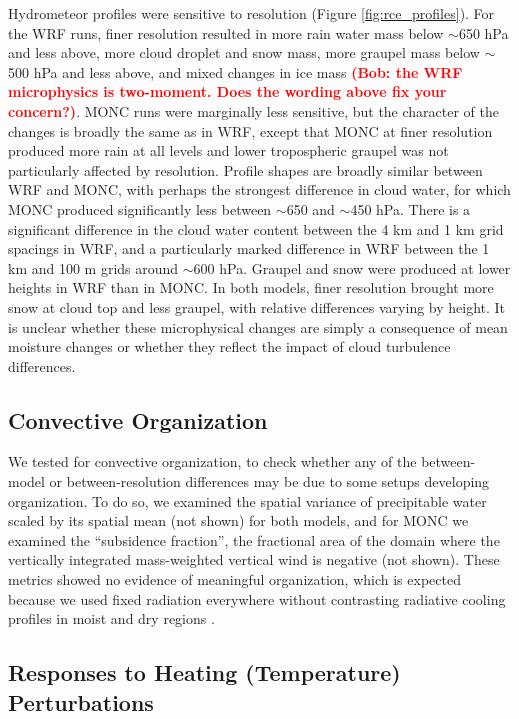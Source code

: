 \documentclass[draft]{agujournal2019}
\newcommand{\todo}[1]{\textcolor{red}{\textbf{(#1)}}}
\begin{document}
Hydrometeor profiles were sensitive to resolution (Figure
\ref{fig:rce_profiles}). For the WRF runs, finer resolution resulted in more
rain water mass below $\sim$650 hPa and less above, more cloud droplet and snow
mass, more graupel mass below $\sim$500 hPa and less above, and mixed changes in
ice mass \todo{Bob: the WRF microphysics is two-moment. Does the wording above
fix your concern?}. MONC runs were marginally less sensitive, but the character
of the changes is broadly the same as in WRF, except that MONC at finer
resolution produced more rain at all levels and lower tropospheric graupel was
not particularly affected by resolution. Profile shapes are broadly similar
between WRF and MONC, with perhaps the strongest difference in cloud water, for
which MONC produced significantly less between $\sim$650 and $\sim$450 hPa.
There is a significant difference in the cloud water content between the 4 km
and 1 km grid spacings in WRF, and a particularly marked difference in WRF
between the 1 km and 100 m grids around $\sim$600 hPa. Graupel and snow were
produced at lower heights in WRF than in MONC. In both models, finer resolution
brought more snow at cloud top and less graupel, with relative differences
varying by height. It is unclear whether these microphysical changes are simply
a consequence of mean moisture changes or whether they reflect the impact of
cloud turbulence differences.

\subsection{Convective Organization}

We tested for convective organization, to check whether any of the between-model
or between-resolution differences may be due to some setups developing
organization. To do so, we examined the spatial variance of precipitable water
scaled by its spatial mean (not shown) for both models, and for MONC we examined
the ``subsidence fraction'', the fractional area of the domain where the
vertically integrated mass-weighted vertical wind is negative (not shown). These
metrics showed no evidence of meaningful organization, which is expected because
we used fixed radiation everywhere without contrasting radiative cooling
profiles in moist and dry regions \cite{Muller_GRL_2015}.

\subsection{Responses to Heating (Temperature) Perturbations}
\end{document}

